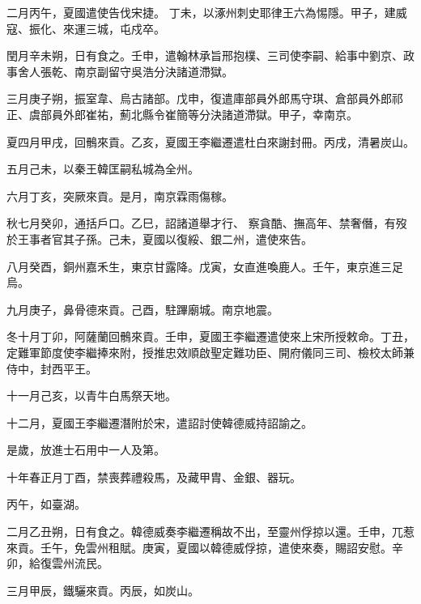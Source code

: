 \begin{pinyinscope}
 二月丙午，夏國遣使告伐宋捷。
 丁未，以涿州刺史耶律王六為惕隱。甲子，建威寇、振化、來運三城，屯戍卒。



 閏月辛未朔，日有食之。壬申，遣翰林承旨邢抱樸、三司使李嗣、給事中劉京、政事舍人張乾、南京副留守吳浩分決諸道滯獄。



 三月庚子朔，振室韋、烏古諸部。戊申，復遣庫部員外郎馬守琪、倉部員外郎祁正、虞部員外郎崔祐，薊北縣令崔簡等分決諸道滯獄。甲子，幸南京。



 夏四月甲戌，回鶻來貢。乙亥，夏國王李繼遷遣杜白來謝封冊。丙戌，清暑炭山。



 五月己未，以秦王韓匡嗣私城為全州。



 六月丁亥，突厥來貢。是月，南京霖雨傷稼。



 秋七月癸卯，通括戶口。乙巳，詔諸道舉才行、
 察貪酷、撫高年、禁奢僭，有歿於王事者官其子孫。己未，夏國以復綏、銀二州，遣使來告。



 八月癸酉，銅州嘉禾生，東京甘露降。戊寅，女直進喚鹿人。壬午，東京進三足烏。



 九月庚子，鼻骨德來貢。己酉，駐蹕廟城。南京地震。



 冬十月丁卯，阿薩蘭回鶻來貢。壬申，夏國王李繼遷遣使來上宋所授敕命。丁丑，定難軍節度使李繼捧來附，授推忠效順啟聖定難功臣、開府儀同三司、檢校太師兼侍中，封西平王。



 十一月己亥，以青牛白馬祭天地。



 十二月，夏國王李繼遷潛附於宋，遣詔討使韓德威持詔諭之。



 是歲，放進士石用中一人及第。



 十年春正月丁酉，禁喪葬禮殺馬，及藏甲胄、金銀、器玩。



 丙午，如臺湖。



 二月乙丑朔，日有食之。韓德威奏李繼遷稱故不出，至靈州俘掠以還。壬申，兀惹來貢。壬午，免雲州租賦。庚寅，夏國以韓德威俘掠，遣使來奏，賜詔安慰。辛卯，給復雲州流民。



 三月甲辰，鐵驪來貢。丙辰，如炭山。




\end{pinyinscope}
